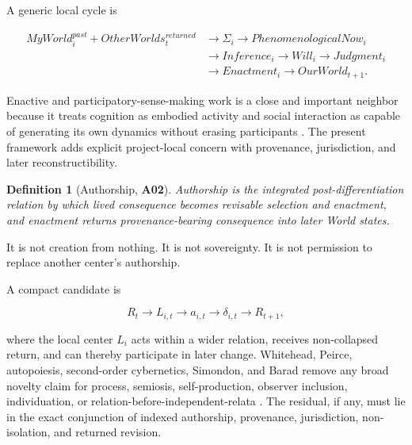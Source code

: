\documentclass[11pt]{article}
\newtheorem{definition}{Definition}
\newcommand{\claim}[1]{\textsf{\textbf{#1}}}
\begin{document}
A generic local cycle is

\begin{equation}
\begin{aligned}
MyWorld_i^{past}+OtherWorlds_t^{returned}
&\rightarrow \Sigma_i\rightarrow PhenomenologicalNow_i\\
&\rightarrow Inference_i\rightarrow Will_i\rightarrow Judgment_i\\
&\rightarrow Enactment_i\rightarrow OurWorld_{t+1}.
\end{aligned}
\end{equation}

Enactive and participatory-sense-making work is a close and important neighbor because it treats cognition as embodied activity and social interaction as capable of generating its own dynamics without erasing participants \cite{DeJaegherDiPaolo2007Participatory,MaturanaVarela1980Autopoiesis}. The present framework adds explicit project-local concern with provenance, jurisdiction, and later reconstructibility.

\begin{definition}[Authorship, \claim{A02}]
Authorship is the integrated post-differentiation relation by which lived consequence becomes revisable selection and enactment, and enactment returns provenance-bearing consequence into later World states.
\end{definition}

It is not creation from nothing. It is not sovereignty. It is not permission to replace another center's authorship.

A compact candidate is

\begin{equation}
R_t\rightarrow L_{i,t}\rightarrow a_{i,t}\rightarrow\delta_{i,t}\rightarrow R_{t+1},
\end{equation}

where the local center $L_i$ acts within a wider relation, receives non-collapsed return, and can thereby participate in later change. Whitehead, Peirce, autopoiesis, second-order cybernetics, Simondon, and Barad remove any broad novelty claim for process, semiosis, self-production, observer inclusion, individuation, or relation-before-independent-relata \cite{Whitehead1978Process,PeirceSemioticsSEP,MaturanaVarela1980Autopoiesis,VonFoerster2003Understanding,Simondon2020Individuation,Barad2007}. The residual, if any, must lie in the exact conjunction of indexed authorship, provenance, jurisdiction, non-isolation, and returned revision.
\end{document}
